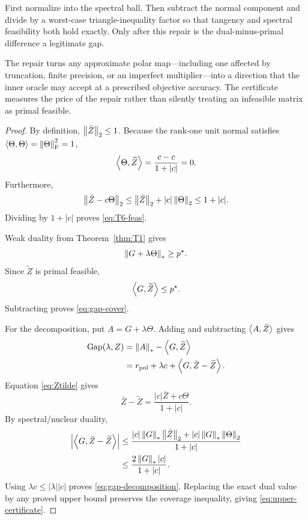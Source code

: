 \begin{proofidea}
First normalize into the spectral ball.  Then subtract the normal component
and divide by a worst-case triangle-inequality factor so that tangency and
spectral feasibility both hold exactly.  Only after this repair is the
dual-minus-primal difference a legitimate gap.
\end{proofidea}

\begin{intuition}
The repair turns any approximate polar map---including one affected by truncation,
finite precision, or an imperfect multiplier---into a direction that the
inner oracle may accept at a prescribed objective accuracy.  The certificate measures the price of the
repair rather than silently treating an infeasible matrix as primal feasible.
\end{intuition}

\begin{proof}
By definition, \(\left\lVert \bar Z\right\rVert_{2}\le1\).  Because the rank-one unit normal
satisfies \(\left\langle \Theta,\Theta\right\rangle=\left\lVert \Theta\right\rVert_{\mathrm F}^2=1\),
\[
\left\langle \Theta,\widetilde Z\right\rangle
=
\frac{c-c}{1+|c|}
=0.
\]
Furthermore,
\[
\left\lVert \bar Z-c\Theta\right\rVert_{2}
\le
\left\lVert \bar Z\right\rVert_{2}+|c|\left\lVert \Theta\right\rVert_{2}
\le1+|c|.
\]
Dividing by \(1+|c|\) proves \eqref{eq:T6-feas}.

Weak duality from Theorem~\ref{thm:T1} gives
\[
\left\lVert G+\lambda\Theta\right\rVert_{*}\ge p^\star.
\]
Since \(\widetilde Z\) is primal feasible,
\[
\left\langle G,\widetilde Z\right\rangle\le p^\star.
\]
Subtracting proves \eqref{eq:gap-cover}.

For the decomposition, put \(A=G+\lambda\Theta\).  Adding and subtracting
\(\left\langle A,\bar Z\right\rangle\) gives
\[
\begin{aligned}
\operatorname{Gap}(\lambda,Z)
&=
\left\lVert A\right\rVert_{*}-\left\langle G,\widetilde Z\right\rangle\\
&=
r_{\mathrm{pol}}
+\lambda c
+\left\langle G,\bar Z-\widetilde Z\right\rangle.
\end{aligned}
\]
Equation \eqref{eq:Ztilde} gives
\[
\bar Z-\widetilde Z
=
\frac{|c|\bar Z+c\Theta}{1+|c|}.
\]
By spectral/nuclear duality,
\[
\begin{aligned}
\left|\left\langle G,\bar Z-\widetilde Z\right\rangle\right|
&\le
\frac{|c|\left\lVert G\right\rVert_{*}\left\lVert \bar Z\right\rVert_{2}
      +|c|\left\lVert G\right\rVert_{*}\left\lVert \Theta\right\rVert_{2}}
     {1+|c|}\\
&\le
\frac{2\left\lVert G\right\rVert_{*}|c|}{1+|c|}.
\end{aligned}
\]
Using \(\lambda c\le|\lambda||c|\) proves
\eqref{eq:gap-decomposition}.  Replacing the exact dual value by any proved
upper bound preserves the coverage inequality, giving
\eqref{eq:upper-certificate}.
\end{proof}

